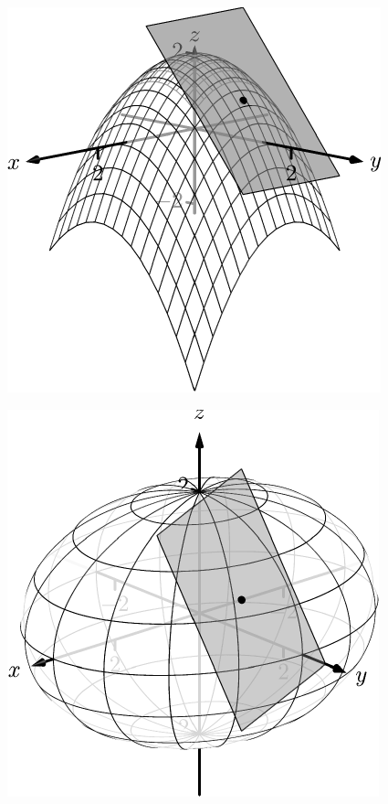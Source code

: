 \documentclass[10pt]{article}
\begin{document}
\includegraphics{figtp16_3DBW.pdf}
\texttt{}

\includegraphics{figtp18_3DBW.pdf}
\texttt{}
\end{document}

